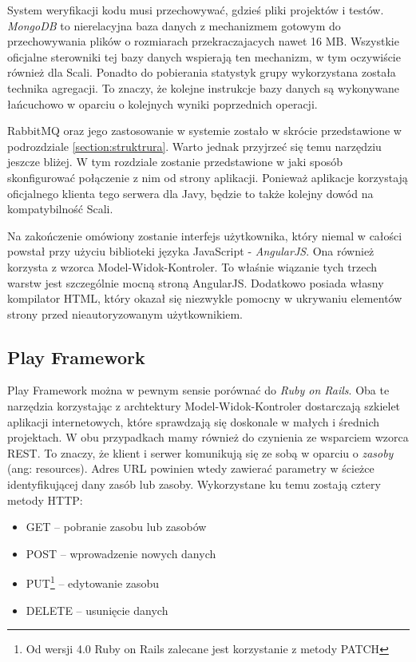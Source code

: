 \documentclass[brudnopis]{xmgr}
\begin{document}
System weryfikacji kodu musi przechowywać, gdzieś pliki projektów i testów. \emph{MongoDB} to nierelacyjna baza danych z mechanizmem gotowym do przechowywania plików o rozmiarach przekraczajacych nawet 16 MB. Wszystkie oficjalne sterowniki tej bazy danych wspierają ten mechanizm, w tym oczywiście również dla Scali. Ponadto do pobierania statystyk grupy wykorzystana została technika agregacji. To znaczy, że kolejne instrukcje bazy danych są wykonywane łańcuchowo w oparciu o kolejnych wyniki poprzednich operacji.

RabbitMQ oraz jego zastosowanie w systemie zostało w skrócie przedstawione w podrozdziale \ref{section:struktrura}. Warto jednak przyjrzeć się temu narzędziu jeszcze bliżej. W tym rozdziale zostanie przedstawione w jaki sposób skonfigurować połączenie z nim od strony aplikacji. Ponieważ aplikacje korzystają oficjalnego klienta tego serwera dla Javy, będzie to także kolejny dowód na kompatybilność Scali.

Na zakończenie omówiony zostanie interfejs użytkownika, który niemal w całości powstał przy użyciu biblioteki języka JavaScript - \emph{AngularJS}. Ona również korzysta z wzorca Model-Widok-Kontroler. To właśnie wiązanie tych trzech warstw jest szczególnie mocną stroną AngularJS. Dodatkowo posiada własny kompilator HTML, który okazał się niezwykle pomocny w ukrywaniu elementów strony przed nieautoryzowanym użytkownikiem.  

\subsection{Play Framework}

Play Framework można w pewnym sensie porównać do \emph{Ruby on Rails}. Oba te narzędzia korzystając z archtektury Model-Widok-Kontroler dostarczają szkielet aplikacji internetowych, które sprawdzają się doskonale w małych i średnich projektach. W obu przypadkach mamy również do czynienia ze wsparciem wzorca REST. To znaczy, że klient i serwer komunikują się ze sobą w oparciu o \emph{zasoby} (ang: resources). Adres URL powinien wtedy zawierać parametry w ścieżce identyfikującej dany zasób lub zasoby. Wykorzystane ku temu zostają cztery metody HTTP:

\begin{itemize}
\item GET -- pobranie zasobu lub zasobów
\item POST -- wprowadzenie nowych danych
\item PUT\footnote{Od wersji 4.0 Ruby on Rails zalecane jest korzystanie z metody PATCH} -- edytowanie zasobu
\item DELETE -- usunięcie danych
\end{itemize}
\end{document}
